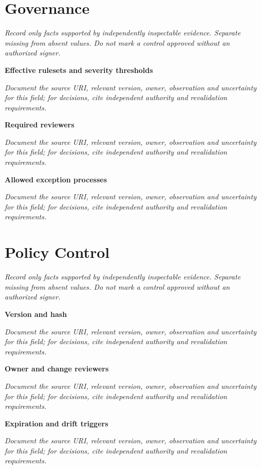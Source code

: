 \documentclass[11pt,letterpaper]{article}
\begin{document}
\section{Governance}
\noindent\emph{Record only facts supported by independently inspectable evidence. Separate missing from absent values. Do not mark a control approved without an authorized signer.}\par
\noindent\textbf{Effective rulesets and severity thresholds}\par
\noindent\emph{Document the source URI, relevant version, owner, observation and uncertainty for this field; for decisions, cite independent authority and revalidation requirements.}\par\medskip
\noindent\textbf{Required reviewers}\par
\noindent\emph{Document the source URI, relevant version, owner, observation and uncertainty for this field; for decisions, cite independent authority and revalidation requirements.}\par\medskip
\noindent\textbf{Allowed exception processes}\par
\noindent\emph{Document the source URI, relevant version, owner, observation and uncertainty for this field; for decisions, cite independent authority and revalidation requirements.}\par\medskip
\section{Policy Control}
\noindent\emph{Record only facts supported by independently inspectable evidence. Separate missing from absent values. Do not mark a control approved without an authorized signer.}\par
\noindent\textbf{Version and hash}\par
\noindent\emph{Document the source URI, relevant version, owner, observation and uncertainty for this field; for decisions, cite independent authority and revalidation requirements.}\par\medskip
\noindent\textbf{Owner and change reviewers}\par
\noindent\emph{Document the source URI, relevant version, owner, observation and uncertainty for this field; for decisions, cite independent authority and revalidation requirements.}\par\medskip
\noindent\textbf{Expiration and drift triggers}\par
\noindent\emph{Document the source URI, relevant version, owner, observation and uncertainty for this field; for decisions, cite independent authority and revalidation requirements.}\par\medskip
\end{document}

